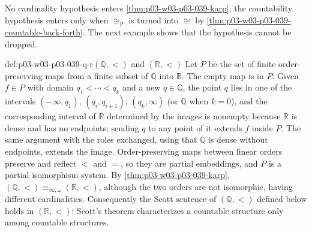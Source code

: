No cardinality hypothesis enters \cref{thm:p03-w03-p03-039-karp}; the
countability hypothesis enters only when \(\cong_p\) is turned into
\(\cong\) by \cref{thm:p03-w03-p03-039-countable-back-forth}. The next
example shows that the hypothesis cannot be dropped.

\begin{hbexample}{def:p03-w03-p03-039-q-r}{\((\mathbb Q,<)\) and \((\mathbb R,<)\)}
Let \(P\) be the set of finite order-preserving maps from a finite subset of
\(\mathbb Q\) into \(\mathbb R\). The empty map is in \(P\). Given
\(f\in P\) with domain \(q_1<\cdots<q_k\) and a new \(q\in\mathbb Q\), the
point \(q\) lies in one of the intervals \((-\infty,q_1)\),
\((q_i,q_{i+1})\), \((q_k,\infty)\) (or \(\mathbb Q\) when \(k=0\)), and the
corresponding interval of \(\mathbb R\) determined by the images is nonempty
because \(\mathbb R\) is dense and has no endpoints; sending \(q\) to any
point of it extends \(f\) inside \(P\). The same argument with the roles
exchanged, using that \(\mathbb Q\) is dense without endpoints, extends the
image. Order-preserving maps between linear orders preserve and reflect
\(<\) and \(=\), so they are partial embeddings, and \(P\) is a partial
isomorphism system. By \cref{thm:p03-w03-p03-039-karp},
\((\mathbb Q,<)\equiv_{\infty,\omega}(\mathbb R,<)\), although the two
orders are not isomorphic, having different cardinalities. Consequently
the Scott sentence of \((\mathbb Q,<)\) defined below holds in
\((\mathbb R,<)\): Scott's theorem characterizes a countable structure only
among countable structures.
\end{hbexample}

